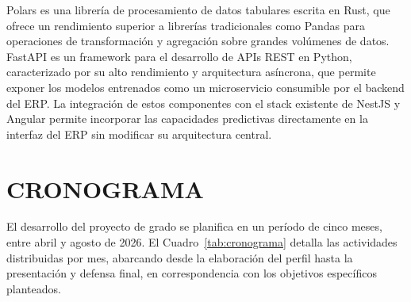 \documentclass{univalle-perfil}
\begin{document}
Polars es una librería de procesamiento de datos tabulares escrita en Rust, que ofrece un rendimiento superior a librerías tradicionales como Pandas para operaciones de transformación y agregación sobre grandes volúmenes de datos. FastAPI es un framework para el desarrollo de APIs REST en Python, caracterizado por su alto rendimiento y arquitectura asíncrona, que permite exponer los modelos entrenados como un microservicio consumible por el backend del ERP. La integración de estos componentes con el stack existente de NestJS y Angular permite incorporar las capacidades predictivas directamente en la interfaz del ERP sin modificar su arquitectura central.

\section{CRONOGRAMA}

El desarrollo del proyecto de grado se planifica en un período de cinco meses, entre abril y agosto de 2026. El Cuadro~\ref{tab:cronograma} detalla las actividades distribuidas por mes, abarcando desde la elaboración del perfil hasta la presentación y defensa final, en correspondencia con los objetivos específicos planteados.
\end{document}
